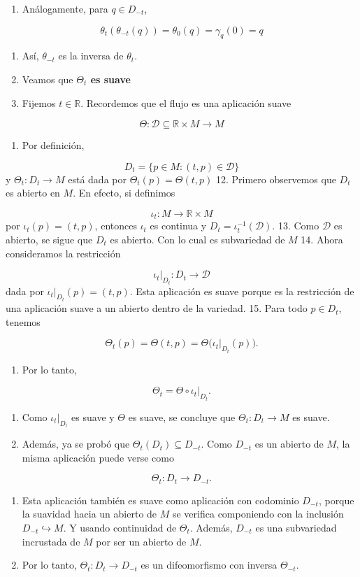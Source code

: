\begin{bookproof}{}
\begin{enumerate}[start=7]
\item Análogamente, para $q\in D_{-t}$,
\end{enumerate}
\[
\theta_t(\theta_{-t}(q))=\theta_0(q)=\gamma_{q}(0)=q
\]
\begin{enumerate}[start=8]
\item Así, $\theta_{-t}$ es la inversa de $\theta_t$.
\item Veamos que \textbf{$\Theta_{t}$ es suave}
\item Fijemos $t\in\mathbb R$. Recordemos que el flujo es una aplicación suave
\end{enumerate}
\[
\Theta:\mathcal D\subseteq\mathbb R\times M\to M
\]
\begin{enumerate}[start=11]
\item Por definición,
\end{enumerate}
\[
D_t=\{p\in M:(t,p)\in\mathcal D\}
\]
y $\Theta_t:D_t\to M$ está dada por $\Theta_t(p)=\Theta(t,p)$ 12. Primero observemos que $D_t$ es abierto en $M$. En efecto, si definimos

\[
\iota_t:M\to\mathbb R\times M
\]
por $\iota_t(p)=(t,p)$, entonces $\iota_t$ es continua y $D_t=\iota_t^{-1}(\mathcal D)$. 13. Como $\mathcal D$ es abierto, se sigue que $D_t$ es abierto. Con lo cual es subvariedad de $M$ 14. Ahora consideramos la restricción

\[
\iota_t|_{D_t}:D_t\to\mathcal D
\]
dada por $\iota_t|_{D_t}(p)=(t,p)$. Esta aplicación es suave porque es la restricción de una aplicación suave a un abierto dentro de la variedad. 15. Para todo $p\in D_t$, tenemos

\[
\Theta_t(p)=\Theta(t,p)=\Theta\big(\iota_t|_{D_t}(p)\big).
\]
\begin{enumerate}[start=16]
\item Por lo tanto,
\end{enumerate}
\[
\Theta_t=\Theta\circ \iota_t|_{D_t}.
\]
\begin{enumerate}[start=17]
\item Como $\iota_t|_{D_t}$ es suave y $\Theta$ es suave, se concluye que $\Theta_t:D_t\to M$ es suave.
\item Además, ya se probó que $\Theta_t(D_t)\subseteq D_{-t}$. Como $D_{-t}$ es un abierto de $M$, la misma aplicación puede verse como
\end{enumerate}
\[
\Theta_t:D_t\to D_{-t}.
\]
\begin{enumerate}[start=19]
\item Esta aplicación también es suave como aplicación con codominio $D_{-t}$, porque la suavidad hacia un abierto de $M$ se verifica componiendo con la inclusión $D_{-t}\hookrightarrow M$. Y usando continuidad de $\Theta_{t}$. Además, $D_{-t}$ es una subvariedad incrustada de $M$ por ser un abierto de $M$.
\item Por lo tanto, $\Theta_t:D_t\to D_{-t}$ es un difeomorfismo con inversa $\Theta_{-t}$.
\end{enumerate}
\bookqed
\end{bookproof}
\label{blk:8d50da}
